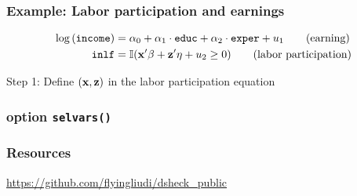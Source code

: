 \documentclass[11pt]{beamer}
\begin{document}
\begin{frame}
  \frametitle{Example: Labor participation and earnings}
\begin{align}
  \log\left({\tt income}\right)
  &=\alpha_{0}+\alpha_{1}\cdot {\tt educ}+\alpha_{2}\cdot {\tt
  exper}+u_1 \tag{earning}\\
{\tt inlf}&=\mathbb{I}(\mathbf{x}'\beta+\mathbf{z}'\eta+u_2\ge 0)
\tag{labor participation}
\end{align}


Step 1: Define $(\mathbf{x}, \mathbf{z})$ in the labor participation equation
\end{frame}


\begin{frame}
\end{frame}

\begin{frame}
  \frametitle{option {\tt selvars()}}
\end{frame}

\begin{frame}
  \frametitle{Resources}

\begin{center}
\href{https://github.com/flyingliudi/dsheck_public}
{\large https://github.com/flyingliudi/dsheck\_public}
\end{center}

\end{frame}
\end{document}
